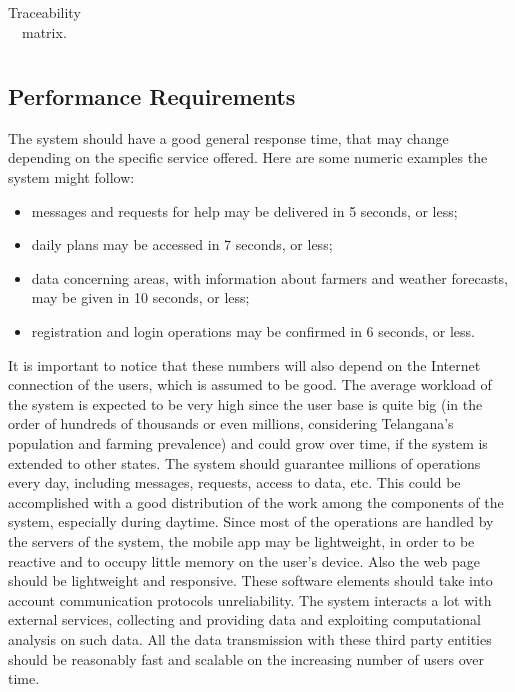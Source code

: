 \begin{table}[H]
\begin{tabular}{|l|l|l|}
        
    \end{tabular}
    \caption{\label{tab:traceabilityMatrix}Traceability matrix.}
\end{table}

\subsection{Performance Requirements}
The system should have a good general response time, that may change depending on the specific service offered. Here are some numeric examples the system might follow:
\begin{itemize}
    \item messages and requests for help may be delivered in 5 seconds, or less;
    \item daily plans may be accessed in 7 seconds, or less;
    \item data concerning areas, with information about farmers and weather forecasts, may be given in 10 seconds, or less;
    \item registration and login operations may be confirmed in 6 seconds, or less.
\end{itemize}
It is important to notice that these numbers will also depend on the Internet connection of the users, which is assumed to be good.
\newline
\newline
The average workload of the system is expected to be very high since the user base is quite big (in the order of hundreds of thousands or even millions, considering Telangana’s population and farming prevalence) and could grow over time, if the system is extended to other states. The system should guarantee millions of operations every day, including messages, requests, access to data, etc. This could be accomplished with a good distribution of the work among the components of the system, especially during daytime. 
\newline
\newline
Since most of the operations are handled by the servers of the system, the mobile app may be lightweight, in order to be reactive and to occupy little memory on the user’s device. Also the web page should be lightweight and responsive. These software elements should take into account communication protocols unreliability.
\newline
\newline
The system interacts a lot with external services, collecting and providing data and exploiting computational analysis on such data. All the data transmission with these third party entities should be reasonably fast and scalable on the increasing number of users over time.



